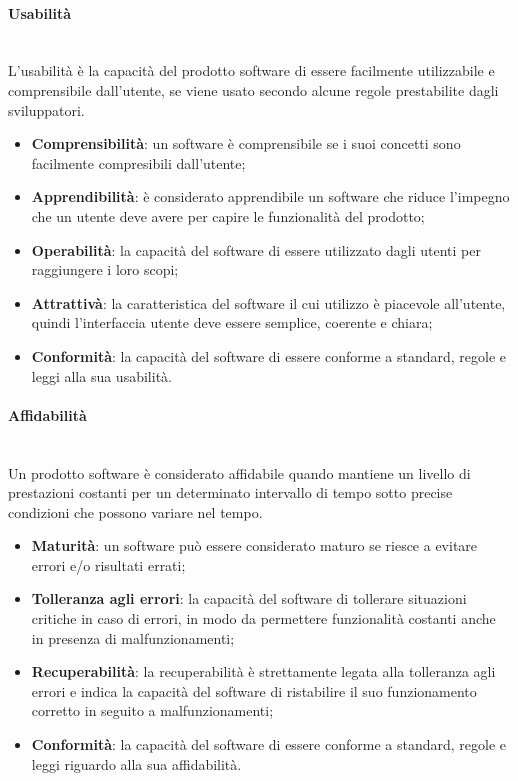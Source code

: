 	\paragraph{Usabilità} \mbox{}\\
	L'usabilità è la capacità del prodotto software di essere facilmente utilizzabile e comprensibile dall'utente, se viene usato secondo alcune regole prestabilite dagli sviluppatori.
	\begin{itemize}
		\item \textbf{Comprensibilità}: un software è comprensibile se i suoi concetti sono facilmente compresibili dall'utente;
		\item \textbf{Apprendibilità}: è considerato apprendibile un software che riduce l'impegno che un utente deve avere per capire le funzionalità del prodotto;
		\item \textbf{Operabilità}: la capacità del software di essere utilizzato dagli utenti per raggiungere i loro scopi;
		\item \textbf{Attrattivà}: la caratteristica del software il cui utilizzo è piacevole all'utente, quindi l'interfaccia utente deve essere semplice, coerente e chiara;
		\item \textbf{Conformità}: la capacità del software di essere conforme a standard, regole e leggi alla sua usabilità.
	\end{itemize}
	\paragraph{Affidabilità} \mbox{}\\
	Un prodotto software è considerato affidabile quando mantiene un livello di prestazioni costanti per un determinato intervallo di tempo sotto precise condizioni che possono variare nel tempo.
	\begin{itemize}
		\item \textbf{Maturità}: un software può essere considerato maturo se riesce a evitare errori e/o risultati errati;
		\item \textbf{Tolleranza agli errori}: la capacità del software di tollerare situazioni critiche in caso di errori, in modo da permettere funzionalità costanti anche in presenza di malfunzionamenti;
		\item \textbf{Recuperabilità}: la recuperabilità è strettamente legata alla tolleranza agli errori e indica la capacità del software di ristabilire il suo funzionamento corretto in seguito a malfunzionamenti;
		\item \textbf{Conformità}: la capacità del software di essere conforme a standard, regole e leggi riguardo alla sua affidabilità.
	\end{itemize}
